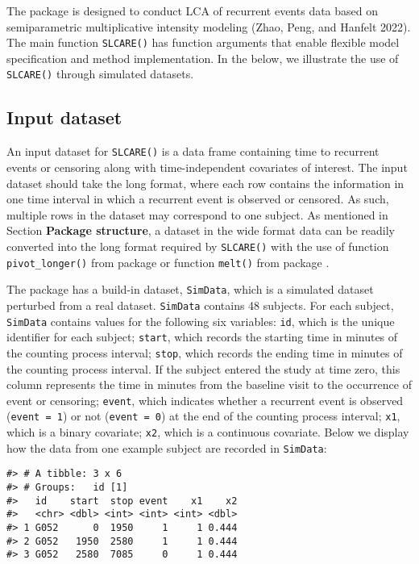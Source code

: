 The package  is designed to conduct LCA of recurrent events data based on semiparametric multiplicative intensity modeling (Zhao, Peng, and Hanfelt 2022).
The main function \texttt{SLCARE()} has function arguments that enable flexible model specification and method implementation. In the below, we illustrate the use of \texttt{SLCARE()} through simulated datasets.

\hypertarget{input-dataset}{%
\subsection{Input dataset}\label{input-dataset}}

An input dataset for \texttt{SLCARE()} is a data frame containing time to recurrent events or censoring along with time-independent covariates of interest.
The input dataset should take the long format, where each row contains the information in one time interval in which a recurrent event is observed or censored.
As such, multiple rows in the dataset may correspond to one subject.
As mentioned in Section \textbf{Package structure}, a dataset in the wide format data can be readily converted into the long format required by \texttt{SLCARE()} with the use of function \texttt{pivot\_longer()} from package  or function \texttt{melt()} from package .

The package  has a build-in dataset, \texttt{SimData}, which is a simulated dataset perturbed from a real
dataset. \texttt{SimData} contains 48 subjects. For each subject,
\texttt{SimData} contains values for the following six variables:
\texttt{id}, which is the unique identifier for each subject;
\texttt{start}, which records the starting time in minutes of the counting process interval;
\texttt{stop}, which records the ending time in minutes of the counting process interval. If the subject entered the study at time zero, this column represents the time in minutes from the baseline visit to the occurrence of event or censoring;
\texttt{event}, which indicates whether a recurrent event is observed (\texttt{event\ =\ 1}) or not (\texttt{event\ =\ 0}) at the end of the counting process interval;
\texttt{x1}, which is a binary covariate;
\texttt{x2}, which is a continuous covariate.
Below we display how the data from one example subject are recorded in \texttt{SimData}:

\begin{verbatim}
#> # A tibble: 3 x 6
#> # Groups:   id [1]
#>   id    start  stop event    x1    x2
#>   <chr> <dbl> <int> <int> <int> <dbl>
#> 1 G052      0  1950     1     1 0.444
#> 2 G052   1950  2580     1     1 0.444
#> 3 G052   2580  7085     0     1 0.444
\end{verbatim}

